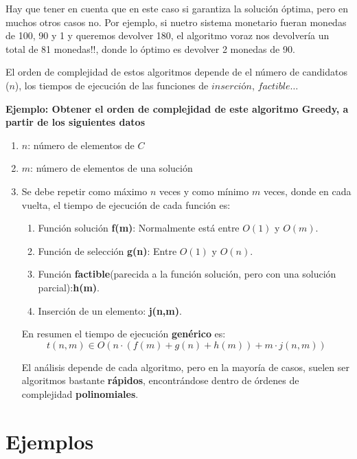 \documentclass[10pt,a4paper,spanish]{report}
\theoremstyle{definition}
\theoremstyle{remark}
\begin{document}
Hay que tener en cuenta que en este caso si garantiza la solución óptima, pero en muchos otros casos no. Por ejemplo, si nuetro sistema monetario fueran monedas de 100, 90 y 1 y queremos devolver 180, el algoritmo voraz nos devolvería un total de 81 monedas!!, donde lo óptimo es devolver 2 monedas de 90.

El orden de complejidad de estos algoritmos depende de el número de candidatos ($n$), los tiempos de ejecución de las funciones de $inserción$, $factible\ldots$

\textbf{\textcolor{electriccrimson}{Ejemplo}: Obtener el orden de complejidad de este algoritmo Greedy, a partir de los siguientes datos}

\begin{enumerate}[---]
    \item $n$: número de elementos de $C$
    \item $m$: número de elementos de una solución
    \item Se debe repetir como máximo $n$ veces y como mínimo $m$ veces, donde en cada vuelta, el tiempo de ejecución de cada función es:
    \begin{enumerate}
        \item Función solución \textbf{\textcolor{electriccrimson}{f(m)}}: Normalmente está entre $O(1)$ y $O(m)$.
        \item Función de selección \textbf{\textcolor{electriccrimson}{g(n)}}: Entre $O(1)$ y $O(n)$.
        \item Función \textbf{\textcolor{electriccrimson}{factible}}(parecida a la función solución, pero con una solución parcial):\textbf{\textcolor{electriccrimson}{h(m)}}.
        \item Inserción de un elemento: \textbf{\textcolor{electriccrimson}{j(n,m)}}.
    \end{enumerate}
    En resumen el tiempo de ejecución \textbf{\textcolor{electriccrimson}{genérico}} es:
    $$t(n,m) \in O(n\cdot(f(m)+g(n)+h(m)) + m\cdot j(n,m)) $$

    El análisis depende de cada algoritmo, pero en la mayoría de casos, suelen ser algoritmos bastante \textbf{\textcolor{electriccrimson}{rápidos}}, encontrándose dentro de órdenes de complejidad \textbf{\textcolor{electriccrimson}{polinomiales}}.
\end{enumerate}


\section{\textcolor{electriccrimson}Ejemplos}
\end{document}

